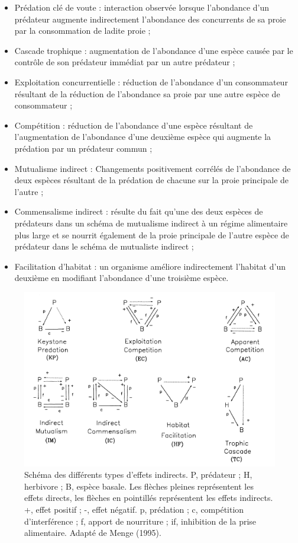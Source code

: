 \documentclass[
  12pt,
  a4paper,
  oneside]{report}
\providecommand{\tightlist}{%
  \setlength{\itemsep}{0pt}\setlength{\parskip}{0pt}}
\begin{document}
\begin{itemize}
\tightlist
\item
  Prédation clé de voute : interaction observée lorsque l'abondance d'un
  prédateur augmente indirectement l'abondance des concurrents de sa
  proie par la consommation de ladite proie ;
\item
  Cascade trophique : augmentation de l'abondance d'une espèce causée
  par le contrôle de son prédateur immédiat par un autre prédateur ;
\item
  Exploitation concurrentielle : réduction de l'abondance d'un
  consommateur résultant de la réduction de l'abondance sa proie par une
  autre espèce de consommateur ;
\item
  Compétition : réduction de l'abondance d'une espèce résultant de
  l'augmentation de l'abondance d'une deuxième espèce qui augmente la
  prédation par un prédateur commun ;
\item
  Mutualisme indirect : Changements positivement corrélés de l'abondance
  de deux espèces résultant de la prédation de chacune sur la proie
  principale de l'autre ;
\item
  Commensalisme indirect : résulte du fait qu'une des deux espèces de
  prédateurs dans un schéma de mutualisme indirect à un régime
  alimentaire plus large et se nourrit également de la proie principale
  de l'autre espèce de prédateur dans le schéma de mutualiste indirect ;
\item
  Facilitation d'habitat : un organisme améliore indirectement l'habitat
  d'un deuxième en modifiant l'abondance d'une troisième espèce.
\end{itemize}

\begin{figure}
\hypertarget{fig:interactions_menge}{%
\centering
\includegraphics{figures/indirect_interaction_menge.png}
\caption{Schéma des différents types d'effets indirects. P, prédateur ;
H, herbivore ; B, espèce basale. Les flèches pleines représentent les
effets directs, les flèches en pointillés représentent les effets
indirects. +, effet positif ; -, effet négatif. p, prédation ; c,
compétition d'interférence ; f, apport de nourriture ; if, inhibition de
la prise alimentaire. Adapté de Menge
(1995).}\label{fig:interactions_menge}
}
\end{figure}
\end{document}
